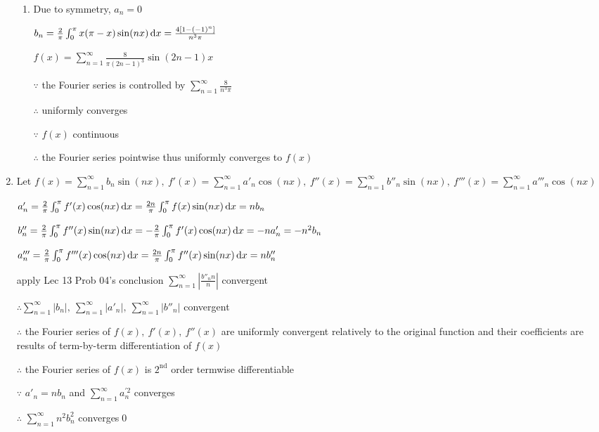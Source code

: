 \begin{enumerate}[1]
\begin{enumerate}[(1)]
        \item
        Due to symmetry, $a_n=0$
        \par $b_n=\frac{2}{\pi} \int_{0}^{\pi} x(\pi-x)\sin (nx) \dif x=\frac{4[1-(-1)^n]}{n^3\pi}$
        \par $ f(x)=  \sum\limits_{n=1}^\infty \frac{8}{\pi (2n-1)^3} \sin (2n-1)x$
        \par $\because$ the Fourier series is controlled by $\sum\limits_{n=1}^\infty \frac{8}{n^3\pi}$
        \par $\therefore$ uniformly converges
        \par $\because$ $f(x)$ continuous
        \par $\therefore$ the Fourier series pointwise thus uniformly converges to $f(x)$
        \end{enumerate}
    
    \item
    Let $f(x)=\sum\limits_{n=1}^\infty b_n\sin (nx),\  f'(x)= \sum \limits_{n=1}^\infty a'_n\cos (nx),\ f''(x)=\sum\limits_{n=1}^\infty b''_n\sin (nx),\  f'''(x)= \sum \limits_{n=1}^\infty a'''_n\cos (nx)$
    \par $a'_n=\frac{2}{\pi} \int_{0}^{\pi} f'(x) \cos (nx)\dif x=\frac{2n}{\pi} \int_{0}^{\pi} f(x) \sin (nx)\dif x=nb_n$
    \par $b''_n=\frac{2}{\pi} \int_{0}^{\pi} f''(x) \sin (nx)\dif x=-\frac{2}{\pi} \int_{0}^{\pi} f'(x) \cos (nx)\dif x=-na'_n=-n^2b_n$
    \par $a'''_n=\frac{2}{\pi} \int_{0}^{\pi} f'''(x) \cos (nx)\dif x=\frac{2n}{\pi} \int_{0}^{\pi} f''(x) \sin (nx)\dif x=nb''_n$
    \par apply Lec 13 Prob 04's conclusion $\sum\limits_{n=1}^\infty \left|\frac{b''_nn}{n}\right|  $ convergent
    \par $\therefore \sum\limits_{n=1}^\infty \left|b_n\right|,\ \sum\limits_{n=1}^\infty\left|a'_n\right|,\ \sum\limits_{n=1}^\infty\left|b''_n\right|$ convergent
    \par $\therefore$ the Fourier series of $f(x),\ f'(x),\ f''(x)$ are uniformly convergent relatively to the original function and their coefficients are results of term-by-term differentiation of $f(x)$ 
    \par$\therefore$ the Fourier series of $f(x)$ is $2^{\text{nd}}$ order termwise differentiable
    \par $\because$ $a'_n=nb_n$ and $\sum\limits_{n=1}^\infty a_{n}^{'2}$ converges
    \par $\therefore$ $\sum\limits_{n=1}^\infty n^2b_n^2$ converges\qed
    \end{enumerate}

